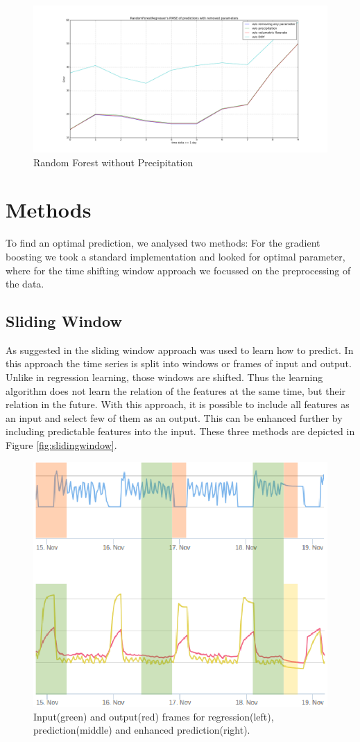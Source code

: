 \documentclass{scrartcl}
\begin{document}
\begin{figure}[H]
  \center
  \includegraphics[width=1\linewidth]{img/RandomForestRegressor_day_error_without_precipation.png}
  \caption{Random Forest without Precipitation}
  \label{fig:RandomForestRegressor_day_error_without_precipation}
\end{figure}

\section{Methods}
\label{sec:methods}
To find an optimal prediction, we analysed two methods: For the gradient boosting we took a standard implementation and looked for optimal parameter, where for the time shifting window approach we focussed on the preprocessing of the data.

\subsection{Sliding Window}
As suggested in \cite{vafaeipour2014application} the sliding window approach was used to learn how to predict. In this approach the time series is split into windows or frames of input and output. Unlike in regression learning, those windows are shifted. Thus the learning algorithm does not learn the relation of the features at the same time, but their relation in the future. With this approach, it is possible to include all features as an input and select few of them as an output. This can be enhanced further by including predictable features into the input. These three methods are depicted in Figure \ref{fig:slidingwindow}.
\begin{figure}[H]
  \center
  \includegraphics[width=0.6\linewidth]{img/regpred.png}
  \caption{Input(green) and output(red) frames for regression(left), prediction(middle) and enhanced prediction(right).}
  \label{fig:correlation}
\end{figure}
\end{document}
